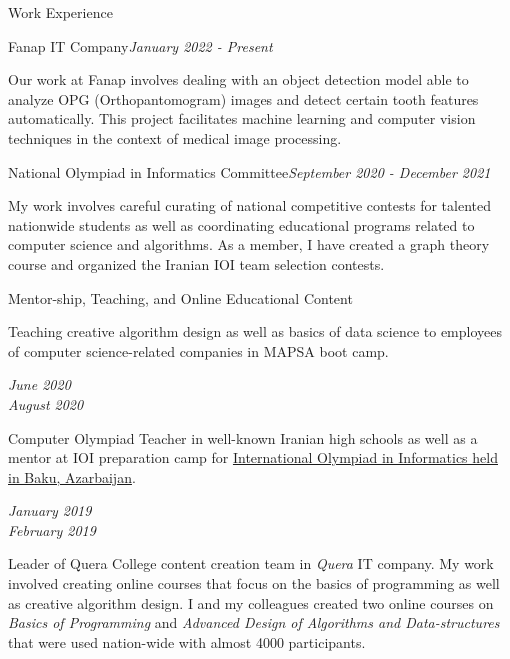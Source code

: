 \documentclass{resume} %
\begin{document}
\begin{rSection}{Work Experience}
\begin{small}
\begin{rSubsection}{Fanap IT Company}{\textcolor{Black!70}{\it January 2022 - Present}}{}{}
\itemsep -2pt
\item Our work at Fanap involves dealing with an object detection model able to analyze OPG (Orthopantomogram) images and detect certain tooth features automatically. This project facilitates machine learning and computer vision techniques in the context of medical image processing.
\end{rSubsection}
\begin{rSubsection}{National Olympiad in Informatics Committee}{\textcolor{Black!70}{\it September 2020 - December 2021}}{}{}
\itemsep -2pt
\item My work involves careful curating of national competitive contests for talented nationwide students as well as coordinating educational programs related to computer science and algorithms. As a member, I have created a graph theory course and organized the Iranian IOI team selection contests.
\end{rSubsection}
\begin{rSubsection}{Mentor-ship, Teaching, and Online Educational Content}{}{}{}
\itemsep -1pt
\item \parbox{15cm}{Teaching creative algorithm design as well as basics of data science to employees of computer science-related companies in MAPSA boot camp.} \hfill
\parbox{3cm}{\begin{flushright}
\begin{center}
\textcolor{Black!70}{\it June 2020 \\ August 2020}
\end{center}
\end{flushright}}
\item \parbox{15cm}{Computer Olympiad Teacher in well-known Iranian high schools as well as a mentor at IOI preparation camp for \href{https://ioi2019.az/}{International Olympiad in Informatics held in Baku, Azarbaijan}.} \hfill 
\parbox{3cm}{\begin{flushright}
\begin{center}
\textcolor{Black!70}{\it January 2019 \\ February 2019}
\end{center}
\end{flushright}}
\item \parbox{15cm}{Leader of Quera College content creation team in {\it Quera} IT company. My work involved creating online courses that focus on the basics of programming as well as creative algorithm design. I and my colleagues created two online courses on {\it Basics of Programming} and {\it Advanced Design of Algorithms and Data-structures} that were used nation-wide with almost 4000 participants.} \hfill 

\end{rSubsection}
\end{small}
\end{rSection}
\end{document}

